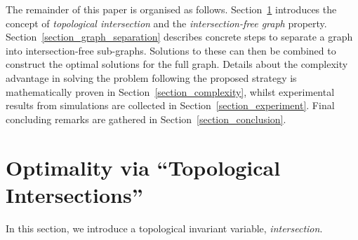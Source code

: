 \documentclass[journal]{IEEEtran}
\begin{document}
The remainder of this paper is organised as follows. Section~\ref{section_intersection} introduces the concept of \textit{topological intersection} and the \textit{intersection-free graph} property.
Section~\ref{section_graph_separation} describes concrete steps to separate a graph into intersection-free sub-graphs. 
Solutions to these can then be combined to construct the optimal solutions for the full graph. 
Details about the complexity advantage in solving the problem following the proposed strategy is mathematically proven in Section~\ref{section_complexity}, whilst experimental results from simulations are collected in Section~\ref{section_experiment}. Final concluding remarks are gathered in Section~\ref{section_conclusion}.



\section{Optimality via ``Topological Intersections''}
\label{section_intersection}
In this section, we introduce a topological invariant variable, \textit{intersection}.  
\end{document}
